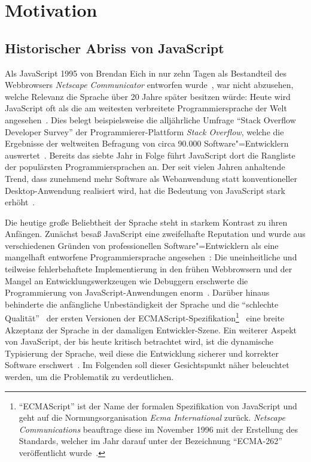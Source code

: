 \chapter{Motivation}
\label{chap:motiviation}

\section{Historischer Abriss von JavaScript}

Als JavaScript 1995 von Brendan Eich in nur zehn Tagen als Bestandteil des Webbrowsers \textit{Netscape Communicator} entworfen wurde~\autocite{SEVERANCE:2012}, war nicht abzusehen, welche Relevanz die Sprache über 20 Jahre später besitzen würde: Heute wird JavaScript oft als die am weitesten verbreitete Programmiersprache der Welt angesehen~\autocite{PAULSON:2007,CROCKFORD:JS_POPULAR}. Dies belegt beispielsweise die alljährliche Umfrage \enquote{Stack Overflow Developer Survey} der Programmierer-Plattform \textit{Stack Overflow}, welche die Ergebnisse der weltweiten Befragung von circa 90.000 Software"=Entwicklern auswertet~\autocite{STACKOVERFLOW:SURVEY}. Bereits das siebte Jahr in Folge führt JavaScript dort die Rangliste der populärsten Programmiersprachen an. Der seit vielen Jahren anhaltende Trend, dass zunehmend mehr Software als Webanwendung statt konventioneller Desktop-Anwendung realisiert wird, hat die Bedeutung von JavaScript stark erhöht~\autocite{TAIVALSAARI:2017,CASTELEYN:2014}.

Die heutige große Beliebtheit der Sprache steht in starkem Kontrast zu ihren Anfängen. Zunächst besaß JavaScript eine zweifelhafte Reputation und wurde aus verschiedenen Gründen von professionellen Software"=Entwicklern als eine mangelhaft entworfene Programmiersprache angesehen~\autocite{CROCKFORD:JS_POPULAR}: Die uneinheitliche und teilweise fehlerbehaftete Implementierung in den frühen Webbrowsern und der Mangel an Entwicklungswerkzeugen wie Debuggern erschwerte die Programmierung von JavaScript-Anwendungen enorm~\autocite{OREILLY:JS_HOW_DID_WE_GET_THERE}. Darüber hinaus behinderte die anfängliche Unbeständigkeit der Sprache und die \enquote{schlechte Qualität}~\autocite{CROCKFORD:JS_MISUNDERSTOOD} der ersten Versionen der ECMAScript-Spezifikation\footnote{\enquote{ECMAScript} ist der Name der formalen Spezifikation von JavaScript und geht auf die Normungsorganisation \textit{Ecma International} zurück. \textit{Netscape Communications} beauftrage diese im November 1996 mit der Erstellung des Standards, welcher im Jahr darauf unter der Bezeichnung \enquote{ECMA-262} veröffentlicht wurde~\autocite{ECMASCRIPT:1997}.}~\autocite{ECMASCRIPT:1997} eine breite Akzeptanz der Sprache in der damaligen Entwickler-Szene. Ein weiterer Aspekt von JavaScript, der bis heute kritisch betrachtet wird, ist die dynamische Typisierung der Sprache, weil diese die Entwicklung sicherer und korrekter Software erschwert~\autocite{NIKHIL:2014,PRADEL:2015}. Im Folgenden soll dieser Gesichtspunkt näher beleuchtet werden, um die Problematik zu verdeutlichen.

